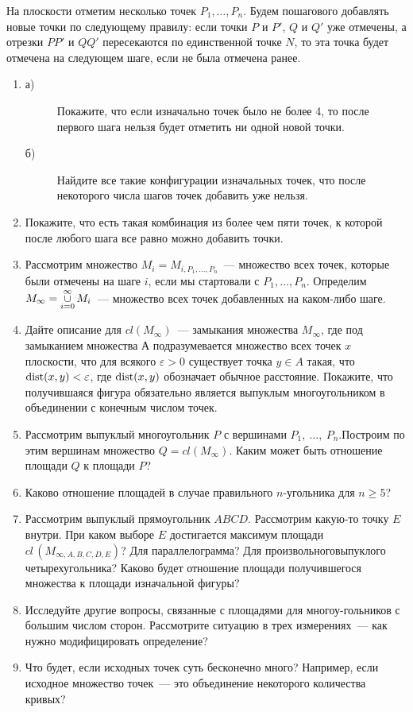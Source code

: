  На плоскости отметим несколько точек $P_1,\dots, P_n$. Будем пошагового добавлять новые точки по следующему правилу:
если точки $P$ и $P'$, $Q$ и $Q'$ уже отмечены, а отрезки $PP'$ и $QQ'$ пересекаются по единственной точке $N$, то эта точка будет отмечена на следующем шаге, если не была отмечена ранее.
\begin{enumerate}
\item
\begin{description}
\item[а)] Покажите, что если изначально точек было не более 4, то после первого шага нельзя будет отметить ни одной новой точки.
\item[б)] Найдите все такие конфигурации изначальных точек, что после некоторого числа шагов точек добавить уже нельзя.
\end{description}

\item Покажите, что есть такая комбинация из более чем пяти точек, к которой после любого шага все равно можно добавить точки.
\item Рассмотрим множество $M_i=M_{i, P_1,\dots, P_n}$~— множество всех точек, которые были отмечены на шаге $i$, если мы стартовали с $P_1,\dots, P_n$. Определим $M_{\infty}=\mathop{\cup}\limits_{i=0}^{\infty} M_i$~— множество всех точек добавленных на каком-либо шаге.
\item Дайте описание для $cl(M_{\infty})$~— замыкания множества $M_{\infty}$, где под замыканием множества А подразумевается множество всех точек $x$ плоскости, что для всякого $\varepsilon>0$ существует точка $y\in A$ такая, что $\operatorname{dist}(x, y)<\varepsilon$, где $\operatorname{dist}(x,y)$ обозначает обычное расстояние. Покажите, что получившаяся фигура обязательно является выпуклым многоугольником в объединении с конечным числом точек.
\item Рассмотрим выпуклый многоугольник $P$ с вершинами $P_1,\ \ldots,\ P_n$.\linebreak Построим по этим вершинам множество $Q=cl(M_{\infty})$. Каким может быть отношение площади $Q$ к площади $P$?
\item Каково отношение площадей в случае правильного $n$-угольника для $n\geq 5$?
\item Рассмотрим выпуклый прямоугольник $ABCD$. Рассмотрим какую-\linebreak то точку $E$ внутри. При каком выборе $E$ достигается максимум площади $cl\,(M_{\infty,A,B,C,D,E})$? Для параллелограмма? Для произвольного\linebreak выпуклого четырехугольника? Каково будет отношение площади получившегося множества к площади изначальной фигуры?
\item Исследуйте другие вопросы, связанные с площадями для многоу-\linebreak гольников с большим числом сторон. Рассмотрите ситуацию в трех измерениях~— как нужно модифицировать определение?
\item Что будет, если исходных точек суть бесконечно много? Например, если исходное множество точек~— это объединение некоторого количества кривых?

\end{enumerate}



